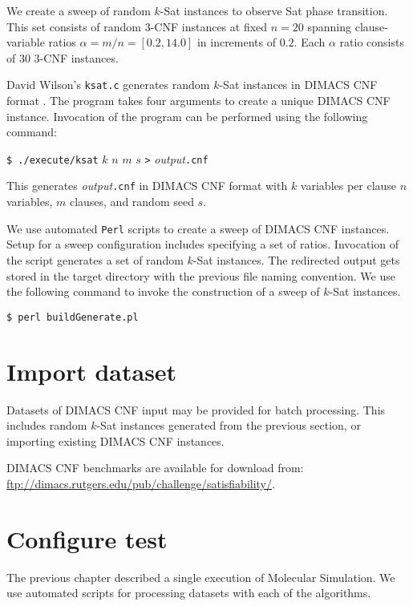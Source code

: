 
We create a sweep of random $k$-{\sc Sat} instances to observe {\sc Sat} phase transition.  This set consists of random $3$-CNF instances at fixed $n=20$ spanning clause-variable ratios $\alpha = m/n = [0.2, 14.0]$ in increments of $0.2$.  Each $\alpha$ ratio consists of 30 3-CNF instances.

David Wilson's \texttt{ksat.c} generates random $k$-{\sc Sat} instances in DIMACS CNF format \cite{wilsonKsat}.  The program takes four arguments to create a unique DIMACS CNF instance.  Invocation of the program can be performed using the following command:

\begin{center}
\texttt{\$ ./execute/ksat} $k$ $n$ $m$ $s$ \texttt{>} \textit{output}\texttt{.cnf}
\end{center}

This generates \textit{output}\texttt{.cnf} in DIMACS CNF format with $k$ variables per clause $n$ variables, $m$ clauses, and random seed $s$.

We use automated \texttt{Perl} scripts to create a sweep of DIMACS CNF instances.  Setup for a sweep configuration includes specifying a set of ratios.  Invocation of the script generates a set of random $k$-{\sc Sat} instances.  The redirected output gets stored in the target directory with the previous file naming convention.  We use the following command to invoke the construction of a sweep of $k$-{\sc Sat} instances.

\begin{center}
\texttt{\$ perl buildGenerate.pl}
\end{center}

	\section{Import dataset}

Datasets of DIMACS CNF input may be provided for batch processing.  This includes random $k$-{\sc Sat} instances generated from the previous section, or importing existing DIMACS CNF instances.   


DIMACS CNF benchmarks are available for download from: \url{ftp://dimacs.rutgers.edu/pub/challenge/satisfiability/}.

	\section{Configure test}
The previous chapter described a single execution of Molecular Simulation.  We use automated scripts for processing datasets with each of the algorithms.

